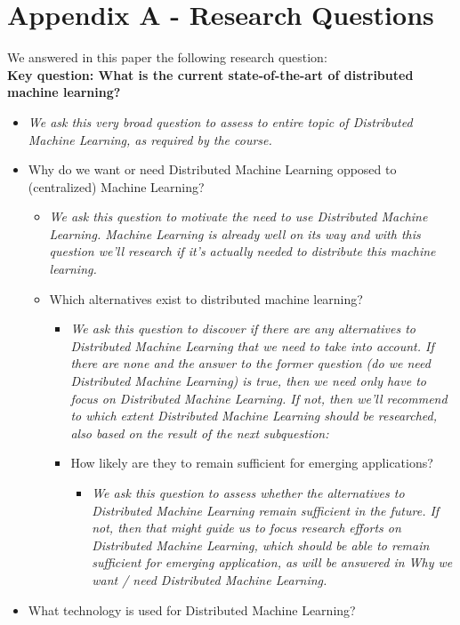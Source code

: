 \section{Appendix A - Research Questions}
We answered in this paper the following research question:\\
\textbf{Key question: What is the current state-of-the-art of distributed machine learning?}
\begin{itemize}
	\item \textit{We ask this very broad question to assess to entire topic of Distributed Machine Learning, as required by the course.}
	\item Why do we want or need Distributed Machine Learning opposed to (centralized) Machine Learning?
	\begin{itemize}
		\item \textit{We ask this question to motivate the need to use Distributed Machine Learning. Machine Learning is already well on its way and with this question we’ll research if it’s actually needed to distribute this machine learning.}
		\item Which alternatives exist to distributed machine learning?
		\begin{itemize}
			\item \textit{We ask this question to discover if there are any alternatives to Distributed Machine Learning that we need to take into account. If there are none and the answer to the former question (do we need Distributed Machine Learning) is true, then we need only have to focus on Distributed Machine Learning. If not, then we’ll recommend to which extent Distributed Machine Learning should be researched, also based on the result of the next subquestion:}
			\item How likely are they to remain sufficient for emerging applications?
			\begin{itemize}
				\item \textit{We ask this question to assess whether the alternatives to Distributed Machine Learning remain sufficient in the future. If not, then that might guide us to focus research efforts on Distributed Machine Learning, which should be able to remain sufficient for emerging application, as will be answered in Why we want / need Distributed Machine Learning.}
			\end{itemize}
		\end{itemize}
	\end{itemize}
	\item What technology is used for Distributed Machine Learning?

\end{itemize}
